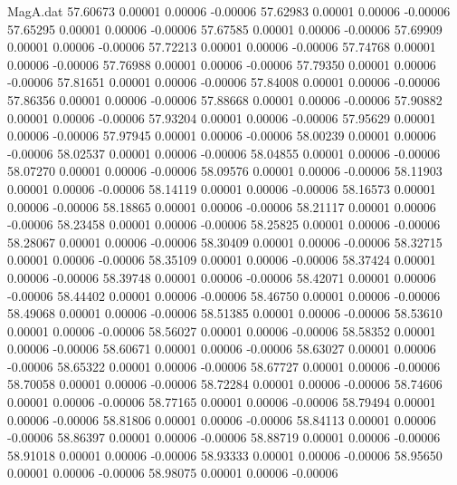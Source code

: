 \begin{filecontents}{MagA.dat}
  57.60673    0.00001    0.00006   -0.00006
  57.62983    0.00001    0.00006   -0.00006
  57.65295    0.00001    0.00006   -0.00006
  57.67585    0.00001    0.00006   -0.00006
  57.69909    0.00001    0.00006   -0.00006
  57.72213    0.00001    0.00006   -0.00006
  57.74768    0.00001    0.00006   -0.00006
  57.76988    0.00001    0.00006   -0.00006
  57.79350    0.00001    0.00006   -0.00006
  57.81651    0.00001    0.00006   -0.00006
  57.84008    0.00001    0.00006   -0.00006
  57.86356    0.00001    0.00006   -0.00006
  57.88668    0.00001    0.00006   -0.00006
  57.90882    0.00001    0.00006   -0.00006
  57.93204    0.00001    0.00006   -0.00006
  57.95629    0.00001    0.00006   -0.00006
  57.97945    0.00001    0.00006   -0.00006
  58.00239    0.00001    0.00006   -0.00006
  58.02537    0.00001    0.00006   -0.00006
  58.04855    0.00001    0.00006   -0.00006
  58.07270    0.00001    0.00006   -0.00006
  58.09576    0.00001    0.00006   -0.00006
  58.11903    0.00001    0.00006   -0.00006
  58.14119    0.00001    0.00006   -0.00006
  58.16573    0.00001    0.00006   -0.00006
  58.18865    0.00001    0.00006   -0.00006
  58.21117    0.00001    0.00006   -0.00006
  58.23458    0.00001    0.00006   -0.00006
  58.25825    0.00001    0.00006   -0.00006
  58.28067    0.00001    0.00006   -0.00006
  58.30409    0.00001    0.00006   -0.00006
  58.32715    0.00001    0.00006   -0.00006
  58.35109    0.00001    0.00006   -0.00006
  58.37424    0.00001    0.00006   -0.00006
  58.39748    0.00001    0.00006   -0.00006
  58.42071    0.00001    0.00006   -0.00006
  58.44402    0.00001    0.00006   -0.00006
  58.46750    0.00001    0.00006   -0.00006
  58.49068    0.00001    0.00006   -0.00006
  58.51385    0.00001    0.00006   -0.00006
  58.53610    0.00001    0.00006   -0.00006
  58.56027    0.00001    0.00006   -0.00006
  58.58352    0.00001    0.00006   -0.00006
  58.60671    0.00001    0.00006   -0.00006
  58.63027    0.00001    0.00006   -0.00006
  58.65322    0.00001    0.00006   -0.00006
  58.67727    0.00001    0.00006   -0.00006
  58.70058    0.00001    0.00006   -0.00006
  58.72284    0.00001    0.00006   -0.00006
  58.74606    0.00001    0.00006   -0.00006
  58.77165    0.00001    0.00006   -0.00006
  58.79494    0.00001    0.00006   -0.00006
  58.81806    0.00001    0.00006   -0.00006
  58.84113    0.00001    0.00006   -0.00006
  58.86397    0.00001    0.00006   -0.00006
  58.88719    0.00001    0.00006   -0.00006
  58.91018    0.00001    0.00006   -0.00006
  58.93333    0.00001    0.00006   -0.00006
  58.95650    0.00001    0.00006   -0.00006
  58.98075    0.00001    0.00006   -0.00006

\end{filecontents}
